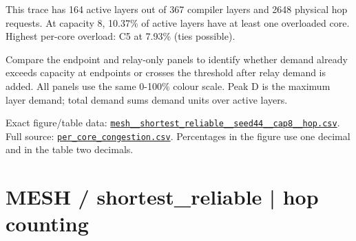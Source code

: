 \documentclass[10pt,a4paper]{article}
\begin{document}
This trace has 164 active layers out of 367 compiler layers and 2648 physical hop requests. At capacity 8, 10.37\% of active layers have at least one overloaded core. Highest per-core overload: C5 at 7.93\% (ties possible).\par
Compare the endpoint and relay-only panels to identify whether demand already exceeds capacity at endpoints or crosses the threshold after relay demand is added. All panels use the same 0-100\% colour scale. Peak D is the maximum layer demand; total demand sums demand units over active layers.\par
Exact figure/table data: \href{\detokenize{file:///home/dhruv-pansuriya/Documents/BTP/Compiler-Driven-ACE/output/pdf/qaoa_methods_congestion/tables/mesh__shortest_reliable__seed44__cap8__hop.csv}}{\nolinkurl{mesh__shortest_reliable__seed44__cap8__hop.csv}}. Full source: \href{\detokenize{file:///home/dhruv-pansuriya/Documents/BTP/Compiler-Driven-ACE/results/qaoa_2seed_2026-10-26/congestion/per_core_congestion.csv}}{\nolinkurl{per_core_congestion.csv}}. Percentages in the figure use one decimal and in the table two decimals.\par
\clearpage
\section*{MESH / shortest\_reliable | hop counting}
\end{document}
